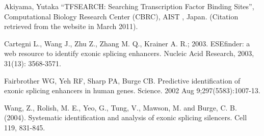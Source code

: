 \documentclass[11pt]{article}
\begin{document}
  Akiyama, Yutaka ``TFSEARCH: Searching Transcription Factor Binding Sites'',
  Computational Biology Research Center (CBRC), AIST , Japan. (Citation
  retrieved from the website in March 2011).

  Cartegni L., Wang J., Zhu Z., Zhang M. Q., Krainer A. R.; 2003.  ESEfinder: a
  web resource to identify exonic splicing enhancers.  Nucleic Acid Research,
  2003, 31(13): 3568-3571.

  Fairbrother WG, Yeh RF, Sharp PA, Burge CB. Predictive identification of
  exonic splicing enhancers in human genes. Science. 2002 Aug
  9;297(5583):1007-13.

  Wang, Z., Rolish, M. E., Yeo, G., Tung, V., Mawson, M. and Burge,
  C. B. (2004). Systematic identification and analysis of exonic splicing
  silencers. Cell 119, 831-845.
\end{document}
